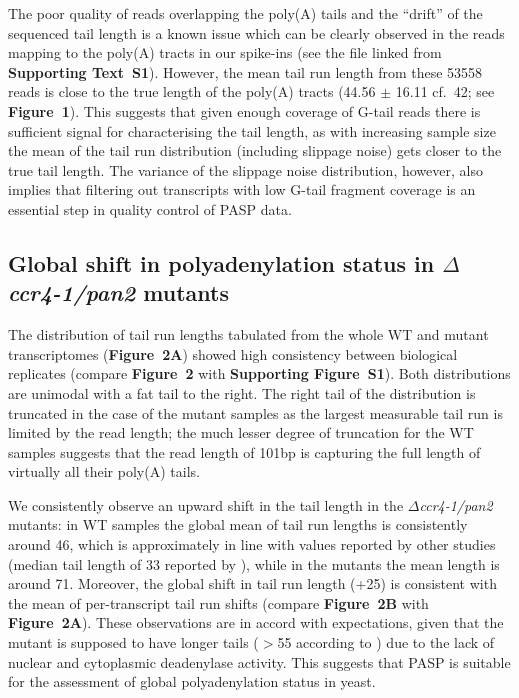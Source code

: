 \documentclass[10pt]{article}
\begin{document}
The poor quality of reads overlapping the poly(A) tails and the ``drift'' of the sequenced tail length is a known issue \cite{wilkening13} which can be clearly observed in the reads mapping to the poly(A) tracts in our spike-ins (see the file linked from \textbf{Supporting Text~S1}). 
However, the mean tail run length from these 53558 reads is close to the true length of the poly(A) tracts (44.56 $\pm$ 16.11 cf.~42; see \textbf{Figure~1}). This suggests that given enough coverage of G-tail reads there is sufficient signal for characterising the tail length, as with increasing sample size the mean of the tail run distribution (including slippage noise) gets closer to the true tail length. The variance of the slippage noise distribution, however, also implies that filtering out transcripts with low G-tail fragment coverage is an essential step in quality control of PASP data.

\subsection*{Global shift in polyadenylation status in \textit{$\Delta$ccr4-1/pan2} mutants}

The distribution of tail run lengths tabulated from the whole WT and mutant transcriptomes (\textbf{Figure~2A}) showed high consistency between biological replicates (compare \textbf{Figure~2} with \textbf{Supporting Figure~S1}). Both distributions are unimodal with a fat tail to the right. The right tail of the distribution is truncated in the case of the mutant samples as the largest measurable tail run is limited by the read length; the much lesser degree of truncation for the WT samples suggests that the read length of 101bp is capturing the full length of virtually all their poly(A) tails.

We consistently observe an upward shift in the tail length in the \textit{$\Delta$ccr4-1/pan2} mutants: in WT samples the global mean of tail run lengths is consistently around 46, which is approximately in line with values reported by other studies (median tail length of 33 reported by \cite{subtelny14}), while in the mutants the mean length is around 71. Moreover, the global shift in tail run length (+25) is consistent with the mean of per-transcript tail run shifts (compare \textbf{Figure~2B} with \textbf{Figure~2A}). These observations are in accord with expectations, given that the mutant is supposed to have longer tails ($>$55 according to \cite{beilharz07}) due to the lack of nuclear and cytoplasmic deadenylase activity. This suggests that PASP is suitable for the assessment of global polyadenylation status in yeast.
\end{document}
